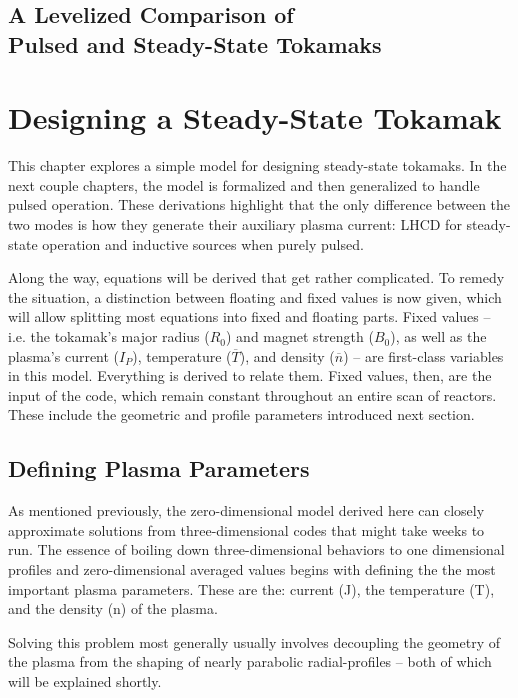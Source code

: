 \documentclass[11pt]{book}
\begin{document}
\section*{A Levelized Comparison of \\ Pulsed and Steady-State Tokamaks}

\let\cleardoublepage\relax \tableofcontents \newpage

\chapter{Designing a Steady-State Tokamak}

This chapter explores a simple model for designing steady-state tokamaks. In the next couple chapters, the model is formalized and then generalized to handle pulsed operation. These derivations highlight that the only difference between the two modes is how they generate their auxiliary plasma current: LHCD for steady-state operation and inductive sources when purely pulsed.

Along the way, equations will be derived that get rather complicated. To remedy the situation, a distinction between floating and fixed values is now given, which will allow splitting most equations into fixed and floating parts. Fixed values -- i.e. the tokamak's major radius ($R_0$) and magnet strength ($B_0$), as well as the plasma's current ($I_P$), temperature ($\overline T$), and density ($\overline n$) -- are first-class variables in this model. Everything is derived to relate them. Fixed values, then, are the input of the code, which remain constant throughout an entire scan of reactors.  These include the geometric and profile parameters introduced next section. 

\section{Defining Plasma Parameters}

As mentioned previously, the zero-dimensional model derived here can closely approximate solutions from three-dimensional codes that might take weeks to run. The essence of boiling down three-dimensional behaviors to one dimensional profiles and zero-dimensional averaged values begins with defining the the most important plasma parameters. These are the: current (J), the temperature (T), and the density (n) of the plasma.

Solving this problem most generally usually involves decoupling the geometry of the plasma from the shaping of nearly parabolic radial-profiles -- both of which will be explained shortly.
\end{document}
